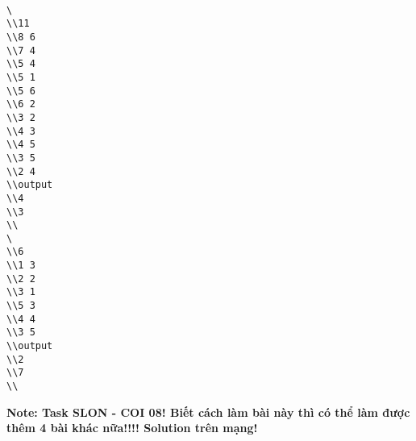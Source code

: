 \begin{verbatim}

\ 
\\11 
\\8 6 
\\7 4 
\\5 4 
\\5 1 
\\5 6 
\\6 2 
\\3 2 
\\4 3 
\\4 5 
\\3 5 
\\2 4 
\\output 
\\4 
\\3 
\\
\ 
\\6 
\\1 3 
\\2 2 
\\3 1 
\\5 3 
\\4 4 
\\3 5 
\\output 
\\2 
\\7 
\\\end{verbatim}

\textbf{    Note: Task SLON - COI 08! Biết cách làm bài này thì có thể làm được thêm 4 bài khác nữa!!!! Solution trên mạng!   }
